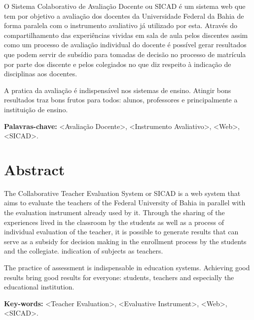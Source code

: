 \documentclass[12pt, a4paper]{report}
\begin{document}
O Sistema Colaborativo de Avaliação Docente ou SICAD é um sistema web que tem por objetivo a avaliação dos docentes da Universidade Federal da Bahia de forma paralela com o instrumento avaliativo já utilizado por esta. Através do compartilhamento das experiências vividas em sala de aula pelos discentes assim como um processo de avaliação individual do docente é possível gerar resultados que podem servir de subsídio para tomadas de decisão no processo de matrícula por parte dos discente e pelos colegiados no que diz respeito à indicação de disciplinas aos docentes.

A pratica da avaliação é indispensável nos sistemas de ensino. Atingir bons resultados traz bons frutos para todos: alunos, professores e principalmente a instituição de ensino.



\textbf{Palavras-chave:} <Avaliação Docente>, <Instrumento Avaliativo>, <Web>, <SICAD>.
 

\newpage
\chapter*{Abstract}
The Collaborative Teacher Evaluation System or SICAD is a web system that aims to evaluate the teachers of the Federal University of Bahia in parallel with the evaluation instrument already used by it. Through the sharing of the experiences lived in the classroom by the students as well as a process of individual evaluation of the teacher, it is possible to generate results that can serve as a subsidy for decision making in the enrollment process by the students and the collegiate. indication of subjects as teachers.

The practice of assessment is indispensable in education systems. Achieving good results bring good results for everyone: students, teachers and especially the educational institution.

\textbf{Key-words:} <Teacher Evaluation>, <Evaluative Instrument>, <Web>, <SICAD>.

\thispagestyle{empty}

\newpage
\tableofcontents
\thispagestyle{empty}


\listoffigures
\cleardoublepage

\end{document}
